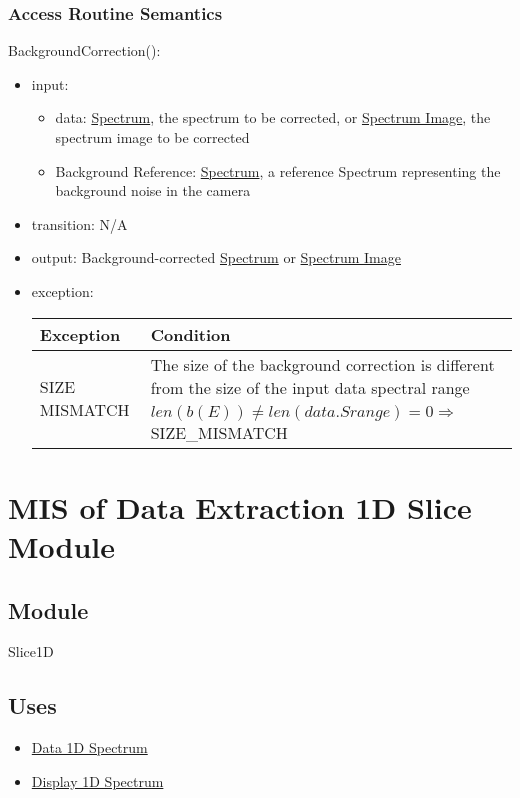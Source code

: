 \documentclass[12pt, titlepage]{article}
\begin{document}
\subsubsection{Access Routine Semantics}
\noindent BackgroundCorrection():
\begin{itemize}
    \item input: 
    \begin{itemize}
        \item data: \hyperref[Mod:Spectrum]{Spectrum}, the spectrum to be corrected, or \hyperref[Mod:SI]{Spectrum Image}, the spectrum image to be corrected
        \item Background Reference: \hyperref[Mod:Spectrum]{Spectrum}, a reference Spectrum representing the background noise in the camera
    \end{itemize}
    \item transition: N/A
    \item output: Background-corrected \hyperref[Mod:Spectrum]{Spectrum} or \hyperref[Mod:SI]{Spectrum Image}
    \item exception:
    \begin{center}
        \begin{tabular}{p{3.5cm} p{12cm}}
            \toprule[0.15em]
            \textbf{Exception} & \textbf{Condition}\\
            \midrule[0.1em]
            \multirow{2}{0.25\textwidth}{SIZE MISMATCH} & The size of the background correction is different from the size of the input data spectral range\\ 
            & $len(b(E)) \neq len(data.Srange) = 0 \Rightarrow$ SIZE\_MISMATCH\\ 
            \bottomrule[0.15em]
        \end{tabular}
    \end{center}
\end{itemize}


\section{MIS of Data Extraction 1D Slice Module} \label{Mod:Slice1D}

\subsection{Module}
Slice1D

\subsection{Uses}
\begin{itemize}
    \item \hyperref[Mod:Spectrum]{Data 1D Spectrum}
    \item \hyperref[Mod:Disp1D]{Display 1D Spectrum}
\end{itemize}
\end{document}
